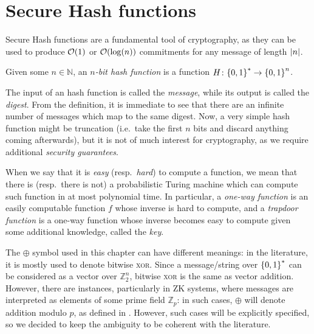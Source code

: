 \section{Secure Hash functions}\label{sec:hash_functions}
Secure Hash functions are a fundamental tool of cryptography, as they can be used to produce 
\(\BigO{1}\) or \(\BigO{\call{\log}{n}}\) commitments for any message of length \(\left\lvert n\right\rvert\).
\begin{definition}
  Given some \(n \in \mathbb{N}\), an \emph{\(n\)-bit hash function} is a function 
  \(H\colon \Set{0, 1}^{*} \to \Set{0, 1}^{n}\).
\end{definition}
The input of an hash function is called the \emph{message}, while its output is called the 
\emph{digest}.
From the definition, it is immediate to see that there are an infinite number of messages which map
to the same digest.
Now, a very simple hash function might be truncation (i.e.\ take the first \(n\) bits and discard 
anything coming afterwards), but it is not of much interest for cryptography, as we require 
additional \emph{security guarantees}.
\begin{remark}
  When we say that it is \emph{easy} (resp.\  \emph{hard}) to compute a function, we mean that 
  there is (resp.\ there is not) a probabilistic Turing machine which can compute such function in
  at most polynomial time.
  In particular, a \emph{one-way function} is an easily computable function \(f\) whose inverse is 
  hard to compute, and a \emph{trapdoor function} is a one-way function whose inverse becomes easy 
  to compute given some additional knowledge, called the \emph{key}.
\end{remark}

\begin{remark}\label{rem:xor_vs_add}
	The \(\oplus \) symbol used in this chapter can have different meanings: in the literature, 
	it is mostly used to denote bitwise \textsc{xor}. Since a message/string over \(\left\{0, 1\right\}^{*}\) 
	can be considered as a vector over \(\mathbb{Z}_{2}^n\), bitwise \textsc{xor} is the same as 
	vector addition.
	However, there are instances, particularly in ZK systems, where messages are interpreted as 
	elements of some prime field \(\mathbb{Z}_p\): in such cases, \(\oplus \) will denote addition
	modulo \(p\), as defined in .
	However, such cases will be explicitly specified, so we decided to keep the ambiguity to be 
	coherent with the literature.
\end{remark}

